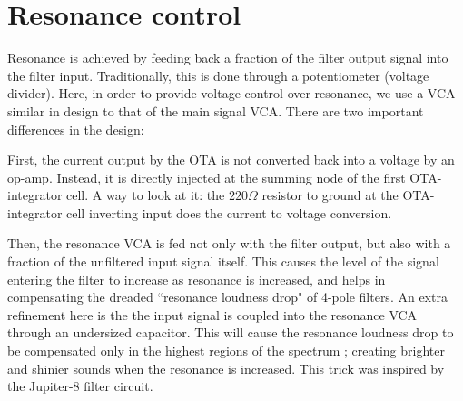 \documentclass[a4paper,11pt]{article}
\begin{document}
\section{Resonance control}

Resonance is achieved by feeding back a fraction of the filter output signal into the filter input. Traditionally, this is done through a potentiometer (voltage divider). Here, in order to provide voltage control over resonance, we use a VCA similar in design to that of the main signal VCA. There are two important differences in the design:

First, the current output by the OTA is not converted back into a voltage by an op-amp. Instead, it is directly injected at the summing node of the first OTA-integrator cell. A way to look at it: the $220 \Omega$ resistor to ground at the OTA-integrator cell inverting input does the current to voltage conversion.

Then, the resonance VCA is fed not only with the filter output, but also with a fraction of the unfiltered input signal itself. This causes the level of the signal entering the filter to increase as resonance is increased, and helps in compensating the dreaded ``resonance loudness drop" of 4-pole filters. An extra refinement here is the the input signal is coupled into the resonance VCA through an undersized capacitor. This will cause the resonance loudness drop to be compensated only in the highest regions of the spectrum ; creating brighter and shinier sounds when the resonance is increased. This trick was inspired by the Jupiter-8 filter circuit.
\end{document}
